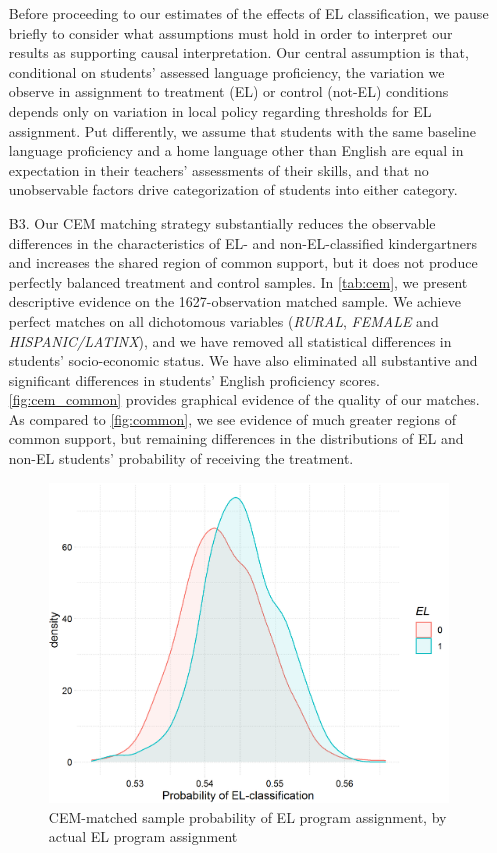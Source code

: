 \documentclass[a4paper, 11pt]{article}
\begin{document}
\begin{enumerate}
	Before proceeding to our estimates of the effects of EL classification, we pause briefly to consider what assumptions must hold in order to interpret our results as supporting causal interpretation. Our central assumption is that, conditional on students' assessed language proficiency, the variation we observe in assignment to treatment (EL) or control (not-EL) conditions depends only on variation in local policy regarding thresholds for EL assignment. Put differently, we assume that students with the same baseline language proficiency and a home language other than English are equal in expectation in their teachers' assessments of their skills, and that no unobservable factors drive categorization of students into either category.
	

	\item[B3.] Our CEM matching strategy substantially reduces the observable differences in the characteristics of EL- and non-EL-classified kindergartners and increases the shared region of common support, but it does not produce perfectly balanced treatment and control samples. In \autoref{tab:cem}, we present descriptive evidence on the 1627-observation matched sample. We achieve perfect matches on all dichotomous variables (\textit{RURAL}, \textit{FEMALE} and \textit{HISPANIC/LATINX}), and we have removed all statistical differences in students' socio-economic status. We have also eliminated all substantive and significant differences in students' English proficiency scores. \autoref{fig:cem_common} provides graphical evidence of the quality of our matches. As compared to \autoref{fig:common}, we see evidence of much greater regions of common support, but remaining differences in the distributions of EL and non-EL students' probability of receiving the treatment.

	

	\begin{figure}
		\begin{center}
			\includegraphics[scale=0.7]{figures/cem1_common_support.png}
			\caption{CEM-matched sample probability of EL program assignment, by actual EL program assignment} \label{fig:cem_common}
		\end{center}
	\end{figure}


\end{enumerate}
\end{document}

